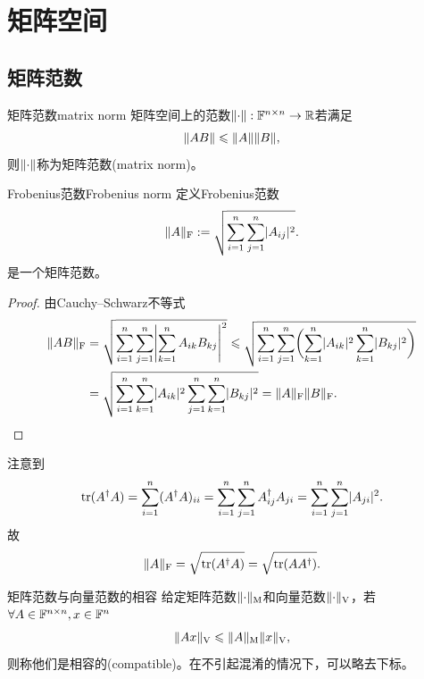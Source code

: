 \section{矩阵空间}
\label{sec:matrix space}

\subsection{矩阵范数}

\begin{definition}
    {矩阵范数}{matrix norm}
    矩阵空间上的范数$\lVert\cdot\rVert :\mathbb{F}^{n\times n} \to \mathbb{R}$若满足
    \begin{equation}
        \lVert AB\rVert \leqslant \lVert A\rVert\lVert B\rVert,
    \end{equation}
    则$\lVert\cdot\rVert$称为矩阵范数(matrix norm)。
\end{definition}


\begin{example}
    {Frobenius范数}{Frobenius norm}
    定义Frobenius范数
    \begin{equation}
        \lVert A\rVert_{\mathrm F} := \sqrt{\sum_{i=1}^n\sum_{j=1}^n\lvert A_{ij}\rvert^2}.
    \end{equation}
    是一个矩阵范数。
    \begin{proof}
        由Cauchy--Schwarz不等式
        \begin{align*}
            \lVert AB\rVert_{\mathrm F} &= \sqrt{\sum_{i=1}^n\sum_{j=1}^n\Biggl\lvert\sum_{k=1}^nA_{ik}B_{kj}\Biggr\rvert^2} \leqslant \sqrt{\sum_{i=1}^n\sum_{j=1}^n\biggl(\sum_{k=1}^n\lvert A_{ik}\rvert^2\sum_{k=1}^n\lvert B_{kj}\rvert^2\biggr)}\\
            &= \sqrt{\sum_{i=1}^n\sum_{k=1}^n\lvert A_{ik}\rvert^2\sum_{j=1}^n\sum_{k=1}^n\lvert B_{kj}\rvert^2} = \lVert A\rVert_{\mathrm F}\lVert B\rVert_{\mathrm F}.
            \qedhere
        \end{align*}
    \end{proof}
    \tcblower
    注意到
    \[
        \operatorname{tr}(A^\dagger A) = \sum_{i=1}^n(A^\dagger A)_{ii} = \sum_{i=1}^n\sum_{j=1}^nA^\dagger_{ij}A_{ji} = \sum_{i=1}^n\sum_{j=1}^n\lvert A_{ji}\rvert^2.
    \]
    故
    \begin{equation}
        \lVert A\rVert_{\mathrm F} = \sqrt{\operatorname{tr}(A^\dagger A)} = \sqrt{\operatorname{tr}(AA^\dagger)}.
    \end{equation}
\end{example}

\begin{definition}
    {矩阵范数与向量范数的相容}{}
    给定矩阵范数$\lVert\cdot\rVert_{\mathrm M}$和向量范数$\lVert\cdot\rVert_{\mathrm V}$，若$\forall A \in \mathbb{F}^{n\times n},x \in \mathbb{F}^n$
    \begin{equation}
        \lVert Ax\rVert_{\mathrm V} \leqslant \lVert A\rVert_{\mathrm M}\lVert x\rVert_{\mathrm V},
    \end{equation}
    则称他们是相容的(compatible)。在不引起混淆的情况下，可以略去下标。
\end{definition}

